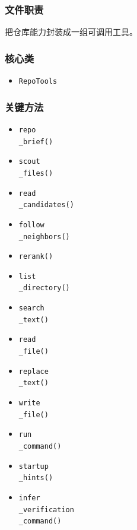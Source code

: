 \documentclass[UTF8,12pt,openany]{ctexbook}
\begin{document}
\subsubsection{文件职责}

把仓库能力封装成一组可调用工具。\par

\subsubsection{核心类}

\begin{itemize}
\item \texttt{RepoTools}
\end{itemize}

\subsubsection{关键方法}

\begin{itemize}
\item \texttt{repo\\_brief()}
\item \texttt{scout\\_files()}
\item \texttt{read\\_candidates()}
\item \texttt{follow\\_neighbors()}
\item \texttt{rerank()}
\item \texttt{list\\_directory()}
\item \texttt{search\\_text()}
\item \texttt{read\\_file()}
\item \texttt{replace\\_text()}
\item \texttt{write\\_file()}
\item \texttt{run\\_command()}
\item \texttt{startup\\_hints()}
\item \texttt{infer\\_verification\\_command()}
\end{itemize}
\end{document}

